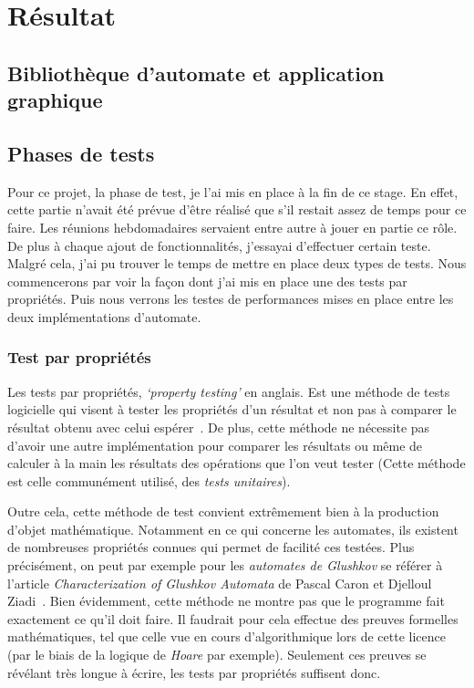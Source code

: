 \section{Résultat}

\subsection{Bibliothèque d'automate et application graphique}


\subsection{Phases de tests}

Pour ce projet, la phase de test, je l'ai mis en place à la fin de ce stage. En 
effet, cette partie n'avait été prévue d'être réalisé que s'il restait assez de 
temps pour ce faire. Les réunions hebdomadaires servaient entre autre à jouer en 
partie ce rôle. De plus à chaque ajout de fonctionnalités, j'essayai d'effectuer 
certain teste. Malgré cela, j'ai pu trouver le temps de mettre en place deux 
types de tests. Nous commencerons par voir la façon dont j'ai mis en place une 
des tests par propriétés. Puis nous verrons les testes de performances mises en 
place entre les deux implémentations d'automate.

\subsubsection{Test par propriétés}

Les tests par propriétés, \textit{`property testing'} en anglais. Est une 
méthode de tests logicielle qui visent à tester les propriétés d'un résultat et 
non pas à comparer le résultat obtenu avec celui espérer~\cite{propertyTesting}. 
De plus, cette méthode ne nécessite pas d'avoir une autre implémentation pour 
comparer les résultats ou même de calculer à la main les résultats des 
opérations que l'on veut tester (Cette méthode est celle communément utilisé, 
des \textit{tests unitaires}). 

\vphantom{}

Outre cela, cette méthode de test convient extrêmement bien à la production 
d'objet mathématique. Notamment en ce qui concerne les automates, ils existent 
de nombreuses propriétés connues qui permet de facilité ces testées. Plus 
précisément, on peut par exemple pour les \textit{automates de Glushkov} se 
référer à l'article \textit{Characterization of Glushkov Automata} de Pascal 
Caron et Djelloul Ziadi~\cite{CaronZiadi2001}. Bien évidemment, cette méthode ne
montre pas que le programme fait exactement ce qu'il doit faire. Il faudrait 
pour cela effectue des preuves formelles mathématiques, tel que celle vue en 
cours d'algorithmique lors de cette licence (par le biais de la logique de 
\textit{Hoare} par exemple). Seulement ces preuves se révélant très longue à 
écrire, les tests par propriétés suffisent donc.  

